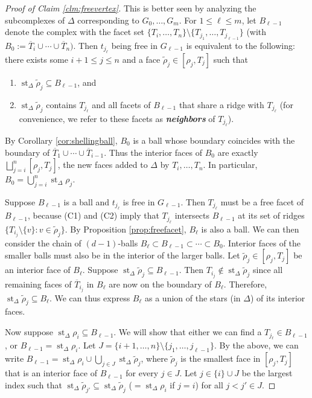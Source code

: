 \documentclass[11pt,twoside]{article}
\theoremstyle{definition}
\DeclareMathOperator{\st}{st}
\begin{document}
\begin{proof}[Proof of Claim \ref{clm:freevertex}]
    This is better seen by analyzing the subcomplexes of $\Delta$ corresponding to $G_0, \dots, G_m$. For $1 \le \ell \le m$, let $B_{\ell-1}$ denote the complex with the facet set $\{T_i, \dots, T_n\}\setminus \{T_{j_1}, \dots, T_{j_{\ell-1}}\}$ (with $B_0 := \overline{T}_i \cup \cdots \cup \overline{T}_n)$. Then $t_{j_\ell}$ being free in $G_{\ell-1}$ is equivalent to the following: there exists some $i + 1 \le j \le n$ and a face $\tilde{\rho}_j \in [\rho_j, T_j]$ such that 
    \begin{enumerate}
        \item[(C1)] $\st_\Delta \tilde{\rho}_j \subseteq B_{\ell-1}$, and
        \item[(C2)] $\st_\Delta \tilde{\rho}_j$ contains $T_{j_\ell}$ and all facets of $B_{\ell-1}$ that share a ridge with $T_{j_\ell}$ (for convenience, we refer to these facets as \textbf{\emph{neighbors}} of $T_{j_\ell}$). 
    \end{enumerate}
    By Corollary \ref{cor:shellingball}, $B_0$ is a ball whose boundary coincides with the boundary of $\overline{T}_1 \cup \cdots \cup \overline{T}_{i-1}$. Thus the interior faces of $B_0$ are exactly $\bigsqcup_{j = i}^n [\rho_j, T_j]$, the new faces added to $\Delta$ by $T_i, \dots, T_n$.  In particular, $B_0 = \bigcup_{j = i}^n \st_\Delta \rho_j$. 

    Suppose $B_{\ell - 1}$ is a ball and $t_{j_\ell}$ is free in $G_{\ell - 1}$. Then $T_{j_\ell}$ must be a free facet of $B_{\ell - 1}$, because (C1) and (C2) imply that $T_{j_\ell}$ intersects $B_{\ell - 1}$ at its set of ridges $\{T_{i_j} \setminus \{v\}: v \in \tilde{\rho}_j\}$. By Proposition \ref{prop:freefacet}, $B_\ell$ is also a ball.  We can then consider the chain of $(d-1)$-balls $B_\ell \subset B_{\ell - 1} \subset \cdots \subset B_0$. Interior faces of the smaller balls must also be in the interior of the larger balls. Let $\tilde{\rho}_j \in [\rho_j, T_j]$ be an interior face of $B_\ell$. Suppose $\st_\Delta \tilde{\rho}_j \subseteq B_{\ell - 1}$. Then $T_{i_j} \notin \st_\Delta \tilde{\rho}_j$ since all remaining faces of $\overline{T}_{i_j}$ in $B_\ell$ are now on the boundary of $B_\ell$. Therefore, $\st_\Delta \tilde{\rho}_j \subseteq B_\ell$. We can thus express $B_\ell$ as a union of the stars (in $\Delta$) of its interior faces.

    Now suppose $\st_\Delta \rho_i \subseteq B_{\ell-1}$. We will show that either we can find a $T_{j_\ell} \in B_{\ell - 1}$, or $B_{\ell - 1} = \st_\Delta \rho_i$. Let $J = \{i+1, \dots, n\} \setminus \{j_1, \dots, j_{\ell - 1}\}$. By the above, we can write $B_{\ell - 1} = \st_\Delta \rho_i \cup \bigcup_{j \in J} \st_\Delta \tilde{\rho}_j$, where $\tilde{\rho}_j$ is the smallest face in $[\rho_j, T_j]$ that is an interior face of $B_{\ell-1}$ for every $j \in J$. Let $j \in \{i\} \cup J$ be the largest index such that $\st_\Delta \tilde{\rho}_{j'} \subseteq \st_\Delta \tilde{\rho}_j$ ($= \st_\Delta \rho_i$ if $j = i$) for all $j < j' \in J$. 


\end{proof}
\end{document}
